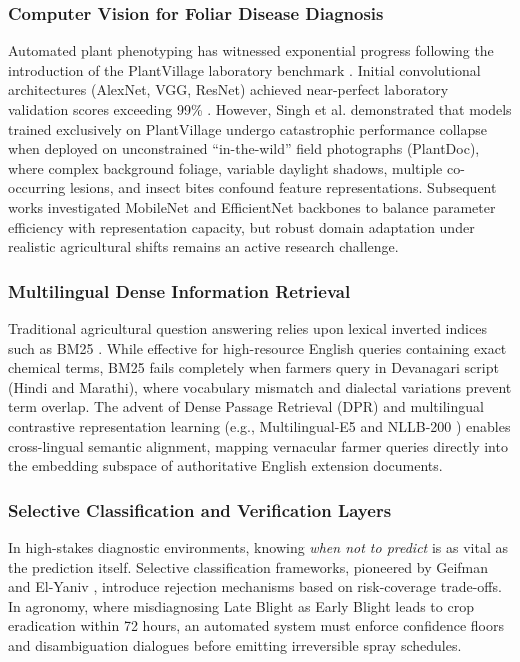 \documentclass[conference]{IEEEtran}
\begin{document}
\subsubsection{Computer Vision for Foliar Disease Diagnosis}
Automated plant phenotyping has witnessed exponential progress following the introduction of the PlantVillage laboratory benchmark \cite{hughes2015plantvillage}. Initial convolutional architectures (AlexNet, VGG, ResNet) achieved near-perfect laboratory validation scores exceeding 99\% \cite{mohanty2016using}. However, Singh et al. \cite{singh2020plantdoc} demonstrated that models trained exclusively on PlantVillage undergo catastrophic performance collapse when deployed on unconstrained ``in-the-wild'' field photographs (PlantDoc), where complex background foliage, variable daylight shadows, multiple co-occurring lesions, and insect bites confound feature representations. Subsequent works investigated MobileNet and EfficientNet backbones \cite{tan2019efficientnet} to balance parameter efficiency with representation capacity, but robust domain adaptation under realistic agricultural shifts remains an active research challenge.

\subsubsection{Multilingual Dense Information Retrieval}
Traditional agricultural question answering relies upon lexical inverted indices such as BM25 \cite{robertson2009probabilistic}. While effective for high-resource English queries containing exact chemical terms, BM25 fails completely when farmers query in Devanagari script (Hindi and Marathi), where vocabulary mismatch and dialectal variations prevent term overlap. The advent of Dense Passage Retrieval (DPR) \cite{karpukhin2020dense} and multilingual contrastive representation learning (e.g., Multilingual-E5 \cite{wang2022text} and NLLB-200 \cite{costa2022no}) enables cross-lingual semantic alignment, mapping vernacular farmer queries directly into the embedding subspace of authoritative English extension documents.

\subsubsection{Selective Classification and Verification Layers}
In high-stakes diagnostic environments, knowing \textit{when not to predict} is as vital as the prediction itself. Selective classification frameworks, pioneered by Geifman and El-Yaniv \cite{geifman2017selective, geifman2019selectivenet}, introduce rejection mechanisms based on risk-coverage trade-offs. In agronomy, where misdiagnosing Late Blight as Early Blight leads to crop eradication within 72 hours, an automated system must enforce confidence floors and disambiguation dialogues before emitting irreversible spray schedules.
\end{document}

